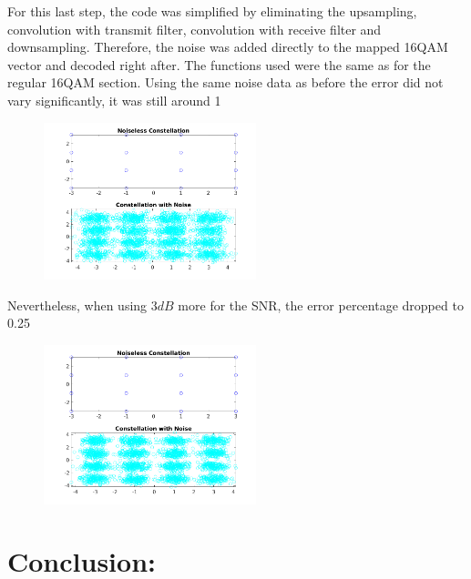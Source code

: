 \documentclass[a4paper,11pt]{article}
\begin{document}
For this last step, the code was simplified by eliminating the upsampling,
convolution with transmit filter, convolution with receive filter and
downsampling. Therefore, the noise was added directly to the mapped 16QAM
vector and decoded right after. The functions used were the same as for the
regular 16QAM section. Using the same noise data as before the error did not
vary significantly, it was still around 1%

\begin{figure}[!hp]
    \begin{center}
      \includegraphics[width=0.55\textwidth]{images/16QAM2.png}
    \end{center}
\end{figure}

Nevertheless, when using $3dB$ more for the SNR, the error percentage
dropped to 0.25%

\begin{figure}[!hp]
    \begin{center}
      \includegraphics[width=0.55\textwidth]{images/16QAM3.png}
    \end{center}
\end{figure}

\newpage

\section{Conclusion:}
\end{document}

